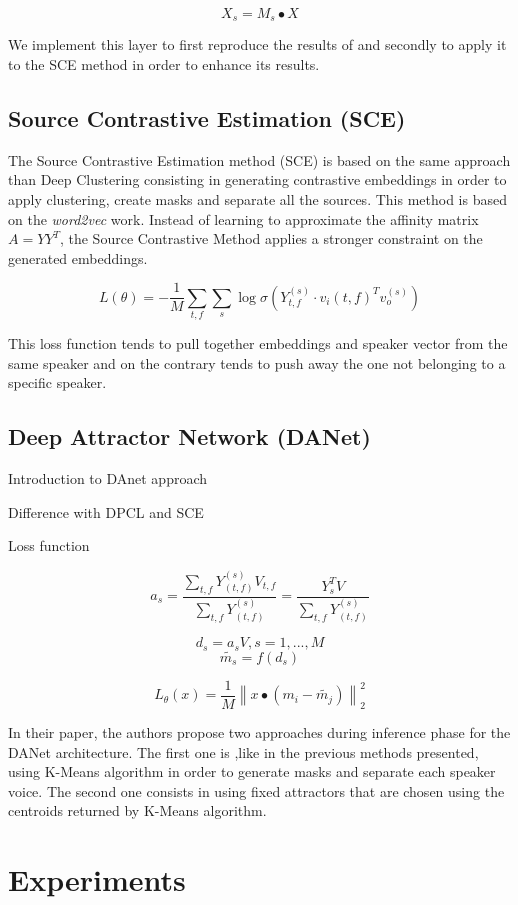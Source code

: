 \documentclass[master,final,11pt]{iscs-thesis}
\newcommand{\norm}[1]{\left\lVert#1\right\rVert}
\begin{document}
\[
X_s = M_s \bullet X
\]

We implement this layer to first reproduce the results of \cite{DPCLV2} and secondly to apply it to the SCE method in order to enhance its results.

\section{Source Contrastive Estimation (SCE)}

The Source Contrastive Estimation method (SCE) \cite{SCE} is based on the same approach than Deep Clustering consisting in generating contrastive embeddings in order to apply clustering, create masks and separate all the sources. This method is based on the \textit{word2vec} work.
Instead of learning to approximate the affinity matrix $A = YY^{T}$, the Source Contrastive Method applies a stronger constraint on the generated embeddings.

\[L(\theta) = - \frac{1}{M} \sum_{t,f} \sum_{s} \log \sigma(Y_{t,f}^{(s)} \cdot v_i(t,f)^{T} v_o^{(s)})\]

This loss function tends to pull together embeddings and speaker vector from the same speaker and on the contrary tends to push away the one not belonging to a specific speaker.


\section{Deep Attractor Network (DANet)}


Introduction to DAnet approach

Difference with DPCL and SCE

Loss function

\[a_s = \frac{\sum_{t,f}{Y_{(t,f)}^{(s)}V_{t,f} }}{\sum_{t,f}{Y_{(t,f)}^{(s)}}} = \frac{{Y_s^TV}}{\sum_{t,f}{Y_{(t,f)}^{(s)}}}\]

\[d_s = a_sV, s = 1,..., M \]
\[\tilde{m_s} = f(d_s)\]

\[L_\theta(x) = \frac{1}{M} \norm{x \bullet (m_i - \tilde{m_j})}^2_2 \]

In their paper, the authors propose two approaches during inference phase for the DANet architecture. The first one is ,like in the previous methods presented, using K-Means algorithm in order to generate masks and separate each speaker voice. The second one consists in using fixed attractors that are chosen using the centroids returned by K-Means algorithm.

\chapter{Experiments}
\end{document}
